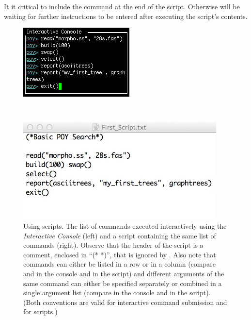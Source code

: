 {It it critical to include the command  at the end of the script. Otherwise \poy will be waiting for further 
instructions to be entered after executing the script's contents.

\begin{figure}
\centering
\begin{minipage}[c]{0.42\textwidth}
\includegraphics[width=\textwidth]{doc/figures/commandlist.jpg}
\end{minipage}
\,
\begin{minipage}[c]{0.53\textwidth}
\includegraphics[width=\textwidth]{doc/figures/script.jpg}
\end{minipage}
\caption{Using \poy scripts. The list of commands executed interactively using the \emph{Interactive Console} 
(left) and a script containing the same list of commands (right). Observe that the header of the script is a comment, 
enclosed in ``(* *)'', that is ignored by \poy. Also note that commands can either be listed in a row or in a column 
(compare  and  in the console and in the script) and different 
arguments of the same command can either be specified separately or combined in a single argument list 
(compare  in the console and in the script). (Both conventions are valid for interactive 
command submission and for scripts.)}
\label{fig:script}
\end{figure}

}
